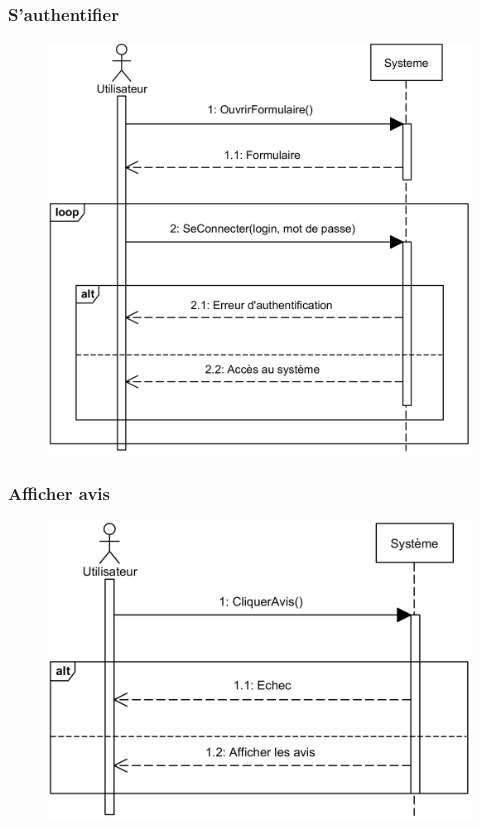     \subsubsection[S’authentifier]{S’authentifier}
        \begin{figure}[H]
            \centering
            \includegraphics[width=130mm]{images/sd-authentifier.png}
            \label{fig:sdAuthentifier}
        \end{figure}
\pagebreak
    \subsubsection[Afficher avis]{Afficher avis}
        \begin{figure}[H]
            \centering
            \includegraphics[width=130mm]{images/sd-afficher-avis.png}
            \label{fig:sdAffavis}
        \end{figure}
            

